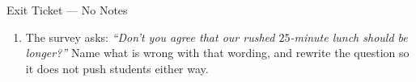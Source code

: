 \documentclass[10pt]{article}
\begin{document}
\begin{notesbox}{Exit Ticket --- No Notes}
\begin{enumerate}[leftmargin=1.6em, itemsep=9pt, topsep=3pt]
  \item The survey asks: \emph{``Don't you agree that our rushed $25$-minute
        lunch should be longer?''} Name what is wrong with that wording, and
        rewrite the question so it does not push students either way.

\end{enumerate}
\end{notesbox}
\end{document}
